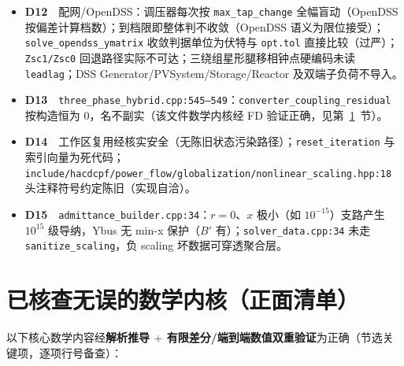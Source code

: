 \documentclass[11pt,a4paper,fontset=fandol]{ctexart}
\newcommand{\file}[1]{\texttt{#1}}
\begin{document}
\begin{itemize}
  \item \textbf{D12}　配网/OpenDSS：调压器每次按 \texttt{max\_tap\_change} 全幅盲动（OpenDSS 按偏差计算档数）；到档限即整体判不收敛（OpenDSS 语义为限位接受）；\texttt{solve\_opendss\_ymatrix} 收敛判据单位为伏特与 \texttt{opt.tol} 直接比较（过严）；\texttt{Zsc1/Zsc0} 回退路径实际不可达；三绕组星形腿移相钟点硬编码未读 \texttt{leadlag}；DSS Generator/PVSystem/Storage/Reactor 及双端子负荷不导入。
  \item \textbf{D13}　\file{three\_phase\_hybrid.cpp:545--549}：\texttt{converter\_coupling\_residual} 按构造恒为 0，名不副实（该文件数学内核经 FD 验证正确，见第~\ref{sec:verified}~节）。
  \item \textbf{D14}　工作区复用经核实安全（无陈旧状态污染路径）；\texttt{reset\_iteration} 与索引向量为死代码；\file{include/hacdcpf/power\_flow/globalization/nonlinear\_scaling.hpp:18} 头注释符号约定陈旧（实现自洽）。
  \item \textbf{D15}　\file{admittance\_builder.cpp:34}：$r=0$、$x$ 极小（如 $10^{-15}$）支路产生 $10^{15}$ 级导纳，Ybus 无 min-x 保护（$B'$ 有）；\file{solver\_data.cpp:34} 未走 \texttt{sanitize\_scaling}，负 scaling 坏数据可穿透聚合层。
\end{itemize}

\newpage
\section{已核查无误的数学内核（正面清单）}
\label{sec:verified}

以下核心数学内容经\textbf{解析推导 $+$ 有限差分/端到端数值双重验证}为正确（节选关键项，逐项行号备查）：
\end{document}
